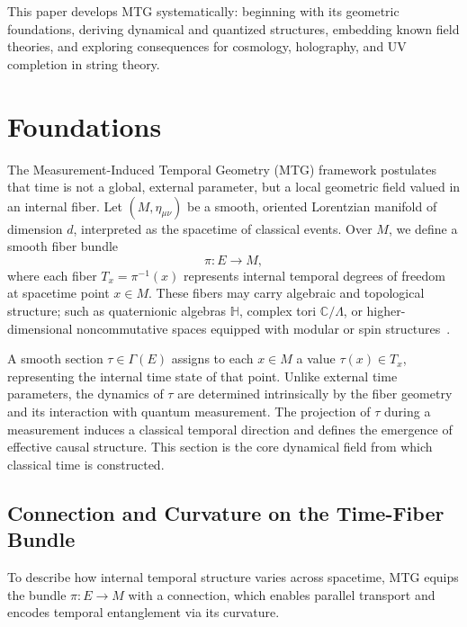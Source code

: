 \documentclass[11pt]{article}
\begin{document}
This paper develops MTG systematically: beginning with its geometric foundations, deriving dynamical and quantized structures, embedding known field theories, and exploring consequences for cosmology, holography, and UV completion in string theory.



\section{Foundations}\label{sec:2}
The Measurement-Induced Temporal Geometry (MTG) framework postulates that time is not a global, external parameter, but a local geometric field valued in an internal fiber. Let \( (M, \eta_{\mu\nu}) \) be a smooth, oriented Lorentzian manifold of dimension \( d \), interpreted as the spacetime of classical events. Over \( M \), we define a smooth fiber bundle
\begin{equation}
\pi : E \to M,
\end{equation}
where each fiber \( T_x = \pi^{-1}(x) \) represents internal temporal degrees of freedom at spacetime point \( x \in M \). These fibers may carry algebraic and topological structure; such as quaternionic algebras \( \mathbb{H} \), complex tori \( \mathbb{C}/\Lambda \), or higher-dimensional noncommutative spaces equipped with modular or spin structures~\cite{bakas2024modulartime}.

A smooth section \( \tau \in \Gamma(E) \) assigns to each \( x \in M \) a value \( \tau(x) \in T_x \), representing the internal time state of that point. Unlike external time parameters, the dynamics of \( \tau \) are determined intrinsically by the fiber geometry and its interaction with quantum measurement. The projection of \( \tau \) during a measurement induces a classical temporal direction and defines the emergence of effective causal structure. This section is the core dynamical field from which classical time is constructed.
\subsection{Connection and Curvature on the Time-Fiber Bundle}

To describe how internal temporal structure varies across spacetime, MTG equips the bundle \( \pi: E \to M \) with a connection, which enables parallel transport and encodes temporal entanglement via its curvature.
\end{document}
